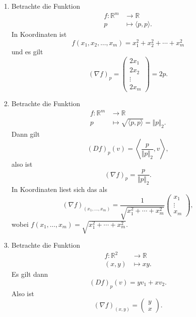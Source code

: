 \documentclass[../main.tex]{subfiles}
\begin{document}
\begin{examples}
  \leavevmode
  \begin{enumerate}[(1)]
    \item Betrachte die Funktion
      \begin{align*}
        f \colon \mathbb{R}^m & \to \mathbb{R} \\
        p & \mapsto \langle p, p \rangle.
      \end{align*}
      In Koordinaten ist
      \[
        f(x_1, x_2, \dots, x_m) = x_1^2 + x_2^2 + \cdots + x_m^2
      \]
      und es gilt
      \[
        {(\nabla f)}_p =
        \begin{pmatrix}
          2x_1 \\
          2x_2 \\
          \vdots \\
          2x_m
        \end{pmatrix}
        = 2p.
      \]
    \item Betrachte die Funktion
      \begin{align*}
        f \colon \mathbb{R}^m & \to \mathbb{R} \\
        p & \mapsto \sqrt{\langle p, p \rangle} = \Vert p \Vert_2.
      \end{align*}
      Dann gilt
      \[
        {(Df)}_p(v) = \left\langle \frac{p}{\Vert p \Vert_2}, v \right\rangle,
      \]
      also ist
      \[
        {(\nabla f)}_p = \frac{p}{\Vert p \Vert_2}.
      \]
      In Koordinaten liest sich das als
      \[
        {(\nabla f)}_{(x_1, \dots, x_m)}
        = \frac{1}{\sqrt{x_1^2 + \cdots + x_m^2}}
        \begin{pmatrix}
          x_1 \\
          \vdots\\
          x_m
        \end{pmatrix},
      \]
      wobei $f(x_1, \dots, x_m) = \sqrt{x_1^2 + \cdots + x_m^2}$.
    \item Betrachte die Funktion
      \begin{align*}
        f \colon \mathbb{R}^2 & \to \mathbb{R} \\
        (x, y) & \mapsto xy.
      \end{align*}
      Es gilt dann
      \[
        {(Df)}_p(v) = y v_1 + x v_2.
      \]
      Also ist
      \[
        {(\nabla f)}_{(x, y)} =
        \begin{pmatrix}
          y \\ x
        \end{pmatrix}.
      \]
  \end{enumerate}
\end{examples}
\end{document}
